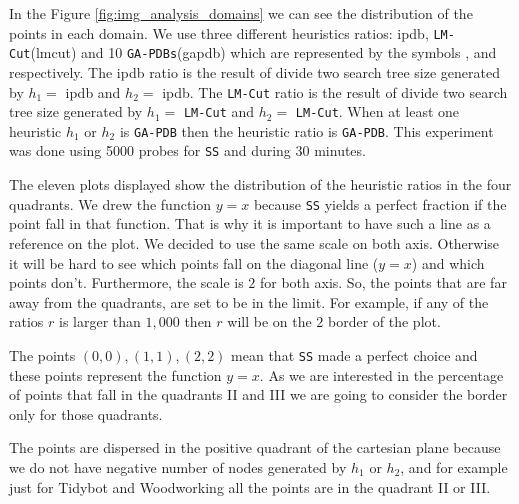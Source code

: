 In the Figure \ref{fig:img_analysis_domains} we can see the distribution of the points in each domain. We use three different heuristics ratios: ipdb, \texttt{LM-Cut}(lmcut) and 10 \texttt{GA-PDBs}(gapdb) which are represented by the symbols  ,  and  respectively. The ipdb ratio is the result of divide two search tree size generated by $h_{1} =$ ipdb and $h_{2} =$ ipdb. The \texttt{LM-Cut} ratio is the result of divide two search tree size generated by $h_{1} =$ \texttt{LM-Cut} and $h_{2} =$  \texttt{LM-Cut}. When at least one heuristic $h_{1}$ or $h_{2}$ is \texttt{GA-PDB} then the heuristic ratio is \texttt{GA-PDB}. This experiment was done using 5000 probes for \texttt{SS} and during 30 minutes.

The eleven plots displayed show the distribution of the heuristic ratios in the four quadrants. We drew the function $y = x$ because \texttt{SS} yields a perfect fraction if the point fall in that function. That is why it is important to have such a line as a reference on the plot. We decided to use the same scale on both axis. Otherwise it will be hard to see which points fall on the diagonal line ($y = x$) and which points don't. Furthermore, the scale is $2$ for both axis. So, the points that are far away from the quadrants, are set to be in the limit. For example, if any of the ratios $r$ is larger than $1,000$ then $r$ will be on the $2$ border of the plot.

The points $(0,0), (1,1), (2,2)$ mean that \texttt{SS} made a perfect choice and these points represent the function $y = x$. As we are interested in the percentage of points that fall in the quadrants II and III we are going to consider the border only for those quadrants.

The points are dispersed in the positive quadrant of the cartesian plane because we do not have negative number of nodes generated by $h_{1}$ or $h_{2}$, and for example just for Tidybot and Woodworking all the points are in the quadrant II or III.

